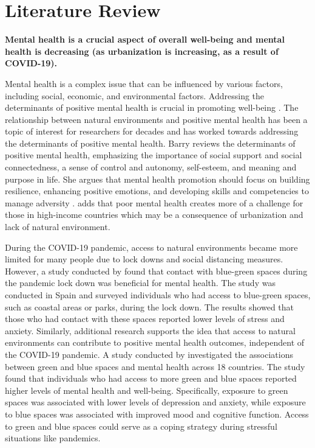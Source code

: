 \documentclass[
  letterpaper,
  authoryear]{elsarticle}
\begin{document}

\hypertarget{literature-review}{%
\section{Literature Review}\label{literature-review}}

\textbf{Mental health is a crucial aspect of overall well-being and
mental health is decreasing (as urbanization is increasing, as a result
of COVID-19).}

Mental health is a complex issue that can be influenced by various
factors, including social, economic, and environmental factors.
Addressing the determinants of positive mental health is crucial in
promoting well-being \citep{barryAddressingDeterminantsPositive2009}.
The relationship between natural environments and positive mental health
has been a topic of interest for researchers for decades and has worked
towards addressing the determinants of positive mental health. Barry
reviews the determinants of positive mental health, emphasizing the
importance of social support and social connectedness, a sense of
control and autonomy, self-esteem, and meaning and purpose in life. She
argues that mental health promotion should focus on building resilience,
enhancing positive emotions, and developing skills and competencies to
manage adversity \citep{barryAddressingDeterminantsPositive2009} .
\citet{whiteAssociationsGreenBlue2021} adds that poor mental health
creates more of a challenge for those in high-income countries which may
be a consequence of urbanization and lack of natural environment.

During the COVID-19 pandemic, access to natural environments became more
limited for many people due to lock downs and social distancing
measures. However, a study conducted by
\citet{pousoContactBluegreenSpaces2021} found that contact with
blue-green spaces during the pandemic lock down was beneficial for
mental health. The study was conducted in Spain and surveyed individuals
who had access to blue-green spaces, such as coastal areas or parks,
during the lock down. The results showed that those who had contact with
these spaces reported lower levels of stress and anxiety. Similarly,
additional research supports the idea that access to natural
environments can contribute to positive mental health outcomes,
independent of the COVID-19 pandemic. A study conducted by
\citet{whiteAssociationsGreenBlue2021} investigated the associations
between green and blue spaces and mental health across 18 countries. The
study found that individuals who had access to more green and blue
spaces reported higher levels of mental health and well-being.
Specifically, exposure to green spaces was associated with lower levels
of depression and anxiety, while exposure to blue spaces was associated
with improved mood and cognitive function. Access to green and blue
spaces could serve as a coping strategy during stressful situations like
pandemics.
\end{document}
